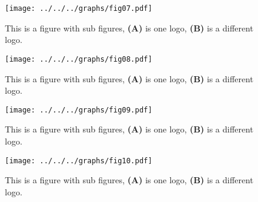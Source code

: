 \documentclass[utf8]{frontiersSCNS} %
\begin{document}
\begin{figure}[h!]
    \begin{center}
        \texttt{[image: ../../../graphs/fig07.pdf]}
    \end{center}
    \caption{This is a figure with sub figures, \textbf{(A)} is one logo, \textbf{(B)} is a different logo.}\label{fig:7}
\end{figure}


\begin{figure}[h!]
    \begin{center}
        \texttt{[image: ../../../graphs/fig08.pdf]}
    \end{center}
    \caption{This is a figure with sub figures, \textbf{(A)} is one logo, \textbf{(B)} is a different logo.}\label{fig:8}
\end{figure}


\begin{figure}[h!]
    \begin{center}
        \texttt{[image: ../../../graphs/fig09.pdf]}
    \end{center}
    \caption{This is a figure with sub figures, \textbf{(A)} is one logo, \textbf{(B)} is a different logo.}\label{fig:9}
\end{figure}


\begin{figure}[h!]
    \begin{center}
        \texttt{[image: ../../../graphs/fig10.pdf]}
    \end{center}
    \caption{This is a figure with sub figures, \textbf{(A)} is one logo, \textbf{(B)} is a different logo.}\label{fig:10}
\end{figure}


\end{document}
